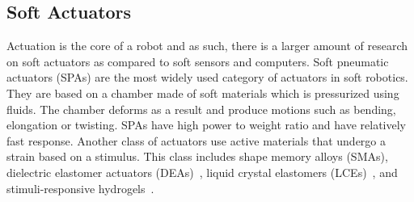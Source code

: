 {\subsection{Soft Actuators}
Actuation is the core of a robot and as such, there is a larger amount of research on soft actuators as compared to soft sensors and computers. Soft pneumatic actuators (SPAs) \cite{Gorissen2017, Branyan2018} are the most widely used category of actuators in soft robotics. They are based on a chamber made of soft materials which is pressurized using fluids. The chamber deforms as a result and produce motions such as bending, elongation or twisting. SPAs have high power to weight ratio and have relatively fast response.  Another class of actuators use active materials that undergo a strain based on a stimulus. This class includes shape memory alloys (SMAs)\cite{Cianchetti2014}, dielectric elastomer actuators (DEAs)~\cite{Carpi2008,Gu2017}, liquid crystal elastomers (LCEs)~\cite{Kularatne2017,Yu2015a}, and stimuli-responsive hydrogels~\cite{Calvert2009,Liu2020,Ionov2014,Banerjee2018}. 
 

}
